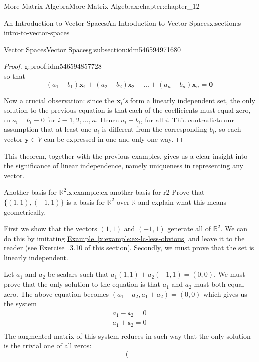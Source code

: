\documentclass[oneside,10pt,]{book}
\newcommand{\xreffont}{\relax}
\numberwithin{equation}{section}
\renewcommand{\vec}[1]{\mathbf{#1}}
\begin{document}
\begin{chapterptx}{More Matrix Algebra}{}{More Matrix Algebra}{}{}{x:chapter:chapter_12}
\begin{sectionptx}{An Introduction to Vector Spaces}{}{An Introduction to Vector Spaces}{}{}{x:section:s-intro-to-vector-spaces}
\begin{subsectionptx}{Vector Spaces}{}{Vector Spaces}{}{}{g:subsection:idm546594971680}
\begin{proof}{}{g:proof:idm546594857728}
\begin{equation*}
\end{equation*}
so that%
\begin{equation*}
\left(a_1-b_1\right) \vec{x}_1+\left(a_2-b_2\right) \vec{x}_2+\ldots +\left(a_n-b_n\right) \vec{x}_n=\vec{0}
\end{equation*}
%
\par
Now a crucial observation: since the \(\vec{x}_i's\) form a linearly independent set, the only solution to the previous equation is that each of the coefficients must equal zero, so \(a_i-b_i=0\) for \(i = 1, 2, \ldots  ,n\).   Hence \(a_i=b_i\), for all \(i\). This contradicts our assumption that at least one \(a_i\) is different from the corresponding \(b_i\), so each vector \(\vec{y} \in  V\) can be expressed in one and only one way.%
\end{proof}
This theorem, together with the previous examples, gives us a clear insight into the significance of linear independence, namely uniqueness in representing any vector.%
\begin{example}{Another basis for \(\mathbb{R}^2\).}{x:example:ex-another-basis-for-r2}%
Prove that \(\{(1, 1), (-1, 1)\}\) is a basis for \(\mathbb{R}^2\) over \(\mathbb{R}\) and explain what this means geometrically.%
\par
First we show that the vectors \((1, 1)\) and \((-1, 1)\) generate all of \(\mathbb{R}^2\). We can do this by imitating \hyperref[x:example:ex-lc-less-obvious]{Example~{\xreffont\ref{x:example:ex-lc-less-obvious}}} and leave it to the reader (see \hyperlink{x:exercise:exercise-12-3-10}{Exercise~{\xreffont 12.3.3.10}} of this section). Secondly, we must prove that the set is linearly independent.%
\par
Let \(a_1\) and \(a_2\) be scalars such that \(a_1 (1, 1) + a_2 (-1, 1) = (0, 0)\). We must prove that the only solution to the equation is that \(a_1\) and \(a_2\) must both equal zero. The above equation becomes \(\left(a_1- a_2 , a_1 + a_2 \right) = (0, 0)\) which gives us the system%
\begin{equation*}
\begin{array}{c}
a_1 - a_{2 }=0 \\
a_1 + a_2=0\\
\end{array}
\end{equation*}
The augmented matrix of this system reduces in such way that the only solution is the trivial one of all zeros:%
\begin{equation*}
\left(
\begin{array}{cc|c}

\end{array}
\end{equation*}
\end{example}
\end{subsectionptx}
\end{sectionptx}
\end{chapterptx}
\end{document}
